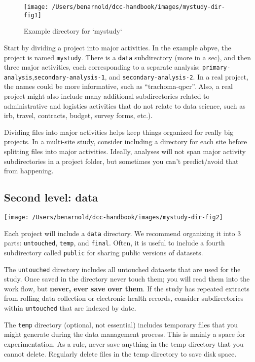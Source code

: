 \documentclass[]{book}
\begin{document}
\begin{figure}
\texttt{[image: /Users/benarnold/dcc-handbook/images/mystudy-dir-fig1]} \caption{Example directory for `mystudy`}\label{fig:dir-fig1}
\end{figure}

Start by dividing a project into major activities. In the example abpve, the project is named \texttt{mystudy}. There is a \texttt{data} subdirectory (more in a sec), and then three major activities, each corresponding to a separate analysis: \texttt{primary-analysis},\texttt{secondary-analysis-1}, and \texttt{secondary-analysis-2}. In a real project, the names could be more informative, such as ``trachoma-qpcr''. Also, a real project might also include many additional subdirectories related to administrative and logistics activities that do not relate to data science, such as irb, travel, contracts, budget, survey forms, etc.).

Dividing files into major activities helps keep things organized for really big projects. In a multi-site study, consider including a directory for each site before splitting files into major activities. Ideally, analyses will not span major activity subdirectories in a project folder, but sometimes you can't predict/avoid that from happening.

\hypertarget{second-level-data}{%
\subsection{Second level: data}\label{second-level-data}}

\texttt{[image: /Users/benarnold/dcc-handbook/images/mystudy-dir-fig2]}

Each project will include a \texttt{data} directory. We recommend organizing it into 3 parts: \texttt{untouched}, \texttt{temp}, and \texttt{final}. Often, it is useful to include a fourth subdirectory called \texttt{public} for sharing public versions of datasets.

The \texttt{untouched} directory includes all untouched datasets that are used for the study. Once saved in the directory never touch them; you will read them into the work flow, but \textbf{never, ever save over them}. If the study has repeated extracts from rolling data collection or electronic health records, consider subdirectories within \texttt{untouched} that are indexed by date.

The \texttt{temp} directory (optional, not essential) includes temporary files that you might generate during the data management process. This is mainly a space for experimentation. As a rule, never save anything in the temp directory that you cannot delete. Regularly delete files in the temp directory to save disk space.
\end{document}

